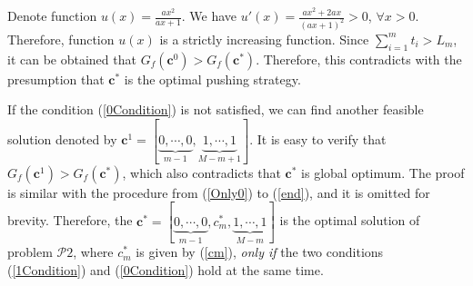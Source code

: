 \documentclass[12pt, draftclsnofoot, onecolumn]{IEEEtran}
\begin{document}
Denote function $u(x)=\frac{a x^2}{a x +1}$. We have $u'(x)=\frac{a x^2+2ax}{(a x +1)^2}>0$, $\forall x >0$. Therefore, function $u(x)$ is a strictly increasing function. Since $\sum\limits_{i=1}^{m} t_i > L_m$, it can be obtained that
$G_{f}(\bm{c}^0) > G_{f}(\bm{c}^{\ast})$. Therefore, this contradicts with the presumption that $\bm{c}^{\ast}$ is the optimal pushing strategy.


If the condition (\ref{0Condition}) is not satisfied, we can find another feasible solution denoted by $\bm{c}^1 =[\underbrace{0, \cdots, 0}_{m-1},\underbrace{1, \cdots, 1}_{M-m+1}]$.
It is easy to verify that $G_{f}(\bm{c}^1) > G_{f}(\bm{c}^{\ast})$, which also contradicts that $\bm{c}^{\ast}$ is global optimum.
The proof is similar with the procedure from (\ref{Only0}) to (\ref{end}), and it is omitted for brevity.
Therefore, the $\bm{c}^{\ast} =[\underbrace{0, \cdots, 0}_{m-1},c_m^{\ast},\underbrace{1, \cdots, 1}_{M-m}]$ is the optimal solution of problem $\mathcal{P}2$, where $c_m^{\ast}$ is given by (\ref{cm}), \textit{only if} the two conditions (\ref{1Condition}) and (\ref{0Condition}) hold at the same time.
\end{document}
